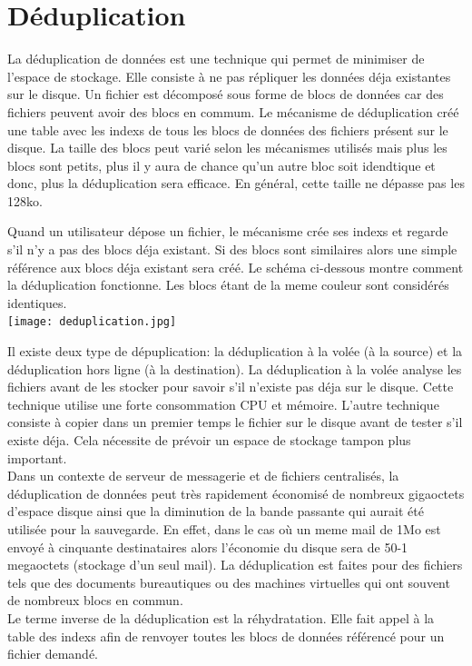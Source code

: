 \documentclass[a4paper]{report}
\begin{document}
	\chapter*{Déduplication}
	La déduplication de données est une technique qui permet de minimiser de l'espace de stockage. Elle consiste à ne pas répliquer les données déja existantes sur le disque. Un fichier est décomposé sous forme de blocs de données car des fichiers peuvent avoir des blocs en commum. Le mécanisme de déduplication créé une table avec les indexs de tous les blocs de données des fichiers présent sur le disque. La taille des blocs peut varié selon les mécanismes utilisés mais plus les blocs sont petits, plus il y aura de chance qu'un autre bloc soit idendtique et donc, plus la déduplication sera efficace. En général, cette taille ne dépasse pas les 128ko.
 
 Quand un utilisateur dépose un fichier, le mécanisme crée ses indexs et regarde s'il n'y a pas des blocs déja existant. Si des blocs sont similaires alors une simple référence aux blocs déja existant sera créé. Le schéma ci-dessous montre comment la déduplication fonctionne. Les blocs étant de la meme couleur sont considérés identiques.\\
\texttt{[image: deduplication.jpg]}

Il existe deux type de dépuplication: la déduplication à la volée (à la source) et la déduplication hors ligne (à la destination). La déduplication à la volée analyse les fichiers avant de les stocker pour savoir s'il n'existe pas déja sur le disque. Cette technique utilise une forte consommation CPU et mémoire. L'autre technique consiste à copier dans un premier temps le fichier sur le disque avant de tester s'il existe déja. Cela nécessite de prévoir un espace de stockage tampon plus important. \\

Dans un contexte de serveur de messagerie et de fichiers centralisés, la déduplication de données peut très rapidement économisé de nombreux gigaoctets d'espace disque ainsi que la diminution de la bande passante qui aurait été utilisée pour la sauvegarde. En effet, dans le cas où un meme mail de 1Mo est envoyé à cinquante destinataires alors l'économie du disque sera de 50-1 megaoctets (stockage d'un seul mail). La déduplication est faites pour des fichiers tels que des documents bureautiques ou des machines virtuelles qui ont souvent de nombreux blocs en commun.\\
Le terme inverse de la déduplication est la réhydratation. Elle fait appel à la table des indexs afin de renvoyer toutes les blocs de données référencé pour un fichier demandé.\\
\end{document}
